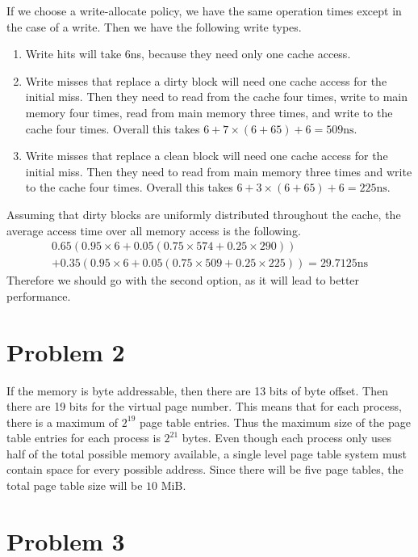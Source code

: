\documentclass[12pt]{article}
\begin{document}
If we choose a write-allocate policy, we have the same operation times except in the case of a write. Then
we have the following write types.
\begin{enumerate}
        \item Write hits will take 6ns, because they need only one cache access.
        \item Write misses that replace a dirty block will need one cache access for the initial miss.
        Then they need to read from the cache four times, write to main memory four times, read from main memory three times,
        and write to the cache four times. Overall this takes \(6+7\times(6+65)+6= 509\text{ns}\).
        \item Write misses that replace a clean block will need one cache access for the initial miss.
        Then they need to read from main memory three times and write to the cache four times.
        Overall this takes \(6+3\times(6+65)+6= 225\text{ns}\).
\end{enumerate}
Assuming that dirty blocks are uniformly distributed throughout the cache, the average access time over all memory access is the following.
\begin{multline*}
        0.65(0.95\times 6+0.05(0.75\times 574+0.25\times 290))\\
        +0.35(0.95\times 6 + 0.05(0.75\times 509+0.25\times 225))=29.7125\text{ns}
\end{multline*}
Therefore we should go with the second option, as it will lead to better performance.

\section*{Problem 2}

If the memory is byte addressable, then there are 13 bits of byte offset. Then there are 19 bits for the virtual page number.
This means that for each process, there is a maximum of \(2^{19}\) page table entries. Thus the maximum size of the page table
entries for each process is \(2^{21}\) bytes. Even though each process only uses half of the total possible memory available,
a single level page table system must contain space for every possible address. Since there will be five page tables, the
total page table size will be \(10\) MiB.

\section*{Problem 3}
\end{document}
